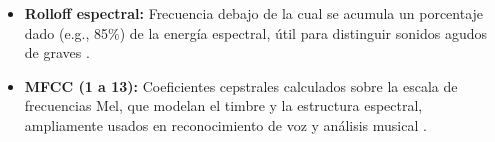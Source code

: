 \begin{itemize}
  \item \textbf{Rolloff espectral:} Frecuencia debajo de la cual se acumula un porcentaje dado (e.g., 85\%) de la energía espectral, útil para distinguir sonidos agudos de graves \cite{tzanetakis2002musical}.

  \item \textbf{MFCC (1 a 13):} Coeficientes cepstrales calculados sobre la escala de frecuencias Mel, que modelan el timbre y la estructura espectral, ampliamente usados en reconocimiento de voz y análisis musical \cite{davis1980tassp}.
\end{itemize}


